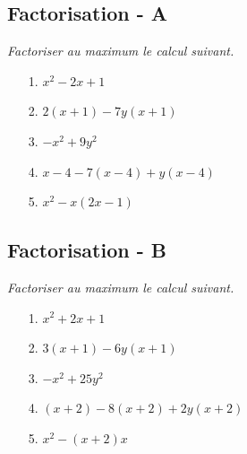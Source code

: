 \documentclass[paper=a4, fontsize=9pt]{scrartcl} %
\begin{document}

\newtheorem{Definition}{Définition}
\newtheorem{Theorem}{Théorème}
\newtheorem{Proposition}{Propriété}

\renewcommand{\labelitemi}{$\bullet$}
\renewcommand{\labelitemii}{$\circ$}

\setlength{\columnseprule}{1pt}

\begin{multicols}{2}

  \subsection*{Factorisation - A}
  \textit{Factoriser au maximum le calcul suivant.}

  \begin{enumerate}
  \item[1.] $x^2 -2x + 1$
  \item[2.] $2(x + 1) - 7y(x + 1)$
  \item[3.] $-x^2 + 9y^2$
  \item[4.] $x - 4 - 7(x - 4) + y(x - 4)$
  \item[5.] $x^2 - x(2x - 1)$
  \end{enumerate}


  \subsection*{Factorisation - B}
  \textit{Factoriser au maximum le calcul suivant.}

  \begin{enumerate}
  \item[1.] $x^2 + 2x + 1$
  \item[2.] $3(x + 1) - 6y(x + 1)$
  \item[3.] $-x^2 + 25y^2$
  \item[4.] $(x + 2) - 8(x + 2) + 2y(x + 2)$
  \item[5.] $x^2 - (x + 2)x$
  \end{enumerate}

\end{multicols}
\end{document}
